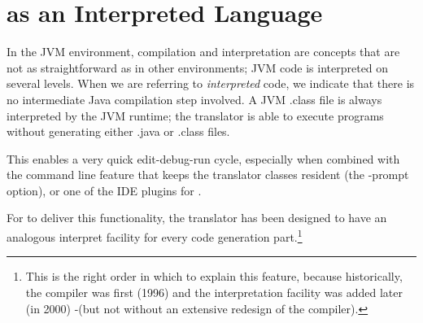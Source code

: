 {\chapter{\nr{} as an Interpreted Language}\label{interpreted}
In the JVM environment, compilation and interpretation are concepts
that are not as straightforward as in other environments; JVM code is
interpreted on several levels. When we are referring to
\emph{interpreted} \nr{} code, we indicate that there is no
intermediate Java compilation step involved. A JVM .class file is
always interpreted by the JVM runtime; the \nr{} translator is able to
execute programs without generating either .java or .class files.

This enables a very quick edit-debug-run cycle, especially when
combined with the command line feature that keeps the translator
classes resident (the -prompt option), or one of the IDE plugins for
\nr{}.

For \nr{} to deliver this functionality, the translator has been
designed to have an analogous interpret facility for every code
generation part.\footnote{This is the right order in which to explain this
  feature, because historically, the compiler was first (1996) and the
  interpretation facility was added later (in 2000) -(but not without an
  extensive redesign of the compiler).}


% 




}
